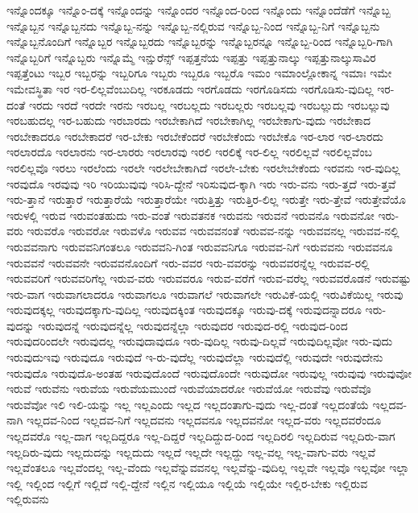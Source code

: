 {ಇನ್ನೊಂದಕ್ಕೂ
ಇನ್ನೊಂ-ದಕ್ಕೆ
ಇನ್ನೊಂದನ್ನು
ಇನ್ನೊಂದರ
ಇನ್ನೊಂದ-ರಿಂದ
ಇನ್ನೊಂದು
ಇನ್ನೊಂದೆಡೆಗೆ
ಇನ್ನೊಬ್ಬ
ಇನ್ನೊಬ್ಬನ
ಇನ್ನೊಬ್ಬನದು
ಇನ್ನೊಬ್ಬ-ನನ್ನು
ಇನ್ನೊಬ್ಬ-ನಲ್ಲಿರುವ
ಇನ್ನೊಬ್ಬ-ನಿಂದ
ಇನ್ನೊಬ್ಬ-ನಿಗೆ
ಇನ್ನೊಬ್ಬನು
ಇನ್ನೊಬ್ಬನೊಂದಿಗೆ
ಇನ್ನೊಬ್ಬರ
ಇನ್ನೊಬ್ಬರದು
ಇನ್ನೊಬ್ಬರನ್ನು
ಇನ್ನೊಬ್ಬರನ್ನೂ
ಇನ್ನೊಬ್ಬ-ರಿಂದ
ಇನ್ನೊಬ್ಬರಿ-ಗಾಗಿ
ಇನ್ನೊಬ್ಬರಿಗೆ
ಇನ್ನೊಬ್ಬರು
ಇನ್ನೊಮ್ಮೆ
ಇನ್ಷುರೆನ್ಸ್
ಇಪ್ಪತ್ತನೆಯ
ಇಪ್ಪತ್ತು
ಇಪ್ಪತ್ತುನಾಲ್ಕು
ಇಪ್ಪತ್ತುನಾಲ್ಕುಸಾವಿರ
ಇಪ್ಪತ್ತೆಂಟು
ಇಬ್ಬರ
ಇಬ್ಬರನ್ನು
ಇಬ್ಬರಿಗೂ
ಇಬ್ಬರು
ಇಬ್ಬರೂ
ಇಬ್ಬರೊ
ಇಮಂ
ಇಮಾಂಲ್ಲೋಕಾನ್ನ
ಇಮಾಃ
ಇಮೇ
ಇಮೇವಸ್ಥಿತಾ
ಇರ
ಇರ-ಲಿಲ್ಲವೆಂಬುದಿಲ್ಲ
ಇರಕೂಡದು
ಇರಗೊಡದು
ಇರಗೊಡಿಸದು
ಇರಗೊಡಿಸು-ವುದಿಲ್ಲ
ಇರ-ದಂತೆ
ಇರದು
ಇರದೆ
ಇರದೇ
ಇರನು
ಇರಬಲ್ಲ
ಇರಬಲ್ಲದು
ಇರಬಲ್ಲರು
ಇರಬಲ್ಲವು
ಇರಬಲ್ಲುದು
ಇರಬಲ್ಲುವು
ಇರಬಹುದಲ್ಲ
ಇರ-ಬಹುದು
ಇರಬಾರದು
ಇರಬೇಕಾಗಿದೆ
ಇರಬೇಕಾಗಿಲ್ಲ
ಇರಬೇಕಾಗು-ವುದು
ಇರಬೇಕಾದ
ಇರಬೇಕಾದರೂ
ಇರಬೇಕಾದರೆ
ಇರ-ಬೇಕು
ಇರಬೇಕೆಂದರೆ
ಇರಬೇಕೆಂದು
ಇರಬೇಕೊ
ಇರ-ಲಾರ
ಇರ-ಲಾರದು
ಇರಲಾರದೊ
ಇರಲಾರನು
ಇರ-ಲಾರರು
ಇರಲಾರವು
ಇರಲಿ
ಇರಲಿಕ್ಕೆ
ಇರ-ಲಿಲ್ಲ
ಇರಲಿಲ್ಲವೆ
ಇರಲಿಲ್ಲವೆಂಬ
ಇರಲಿಲ್ಲವೊ
ಇರಲು
ಇರಲೆಂದು
ಇರಲೇ
ಇರಲೇಬೇಕಾಗಿದೆ
ಇರಲೇ-ಬೇಕು
ಇರಲೇಬೇಕೆಂದು
ಇರವನು
ಇರ-ವುದಿಲ್ಲ
ಇರವುದೊ
ಇರವುವು
ಇರಿ
ಇರಿಯುವುವು
ಇರಿಸಿ-ದ್ದೇನೆ
ಇರಿಸುವುದ-ಕ್ಕಾಗಿ
ಇರು
ಇರು-ವನು
ಇರು-ತ್ತದೆ
ಇರು-ತ್ತವೆ
ಇರು-ತ್ತಾನೆ
ಇರುತ್ತಾರೆ
ಇರುತ್ತಾರೆಯೆ
ಇರುತ್ತಾರೆಯೇ
ಇರುತ್ತಿತ್ತು
ಇರುತ್ತಿರ-ಲಿಲ್ಲ
ಇರುತ್ತೇ
ಇರು-ತ್ತೇವೆ
ಇರುತ್ತೇವೆಯೊ
ಇರುಳಲ್ಲಿ
ಇರುವ
ಇರುವಂತಹುದು
ಇರು-ವಂತೆ
ಇರುವತನಕ
ಇರುವನು
ಇರುವನೆ
ಇರುವನೊ
ಇರುವನೋ
ಇರು-ವರು
ಇರುವರೊ
ಇರುವರೋ
ಇರುವಳೊ
ಇರುವವ
ಇರುವವನಂತೆ
ಇರುವವ-ನನ್ನು
ಇರುವವನಲ್ಲ
ಇರುವವ-ನಲ್ಲಿ
ಇರುವವನಾಗು
ಇರುವವನಿಗಂತಲೂ
ಇರುವವನಿ-ಗಿಂತ
ಇರುವವನಿಗೂ
ಇರುವವ-ನಿಗೆ
ಇರುವವನು
ಇರುವವನೂ
ಇರುವವನೆ
ಇರುವವನೇ
ಇರುವವನೊಂದಿಗೆ
ಇರು-ವವರ
ಇರು-ವವರನ್ನು
ಇರುವವರನ್ನೆಲ್ಲ
ಇರುವವ-ರಲ್ಲಿ
ಇರುವವರಿಗೆ
ಇರುವವರಿಗೆಲ್ಲ
ಇರುವ-ವರು
ಇರುವವರೂ
ಇರುವ-ವರೆಗೆ
ಇರುವ-ವರೆಲ್ಲ
ಇರುವವರೊಡನೆ
ಇರುವಷ್ಟು
ಇರು-ವಾಗ
ಇರುವಾಗಲಾದರೂ
ಇರುವಾಗಲೂ
ಇರುವಾಗಲೆ
ಇರುವಾಗಲೇ
ಇರುವಿಕೆ-ಯಲ್ಲಿ
ಇರುವಿಕೆಯಿಲ್ಲ
ಇರುವು
ಇರುವುದಕ್ಕಲ್ಲ
ಇರುವುದಕ್ಕಾಗು-ವುದಿಲ್ಲ
ಇರುವುದಕ್ಕಿಂತ
ಇರುವುದಕ್ಕೂ
ಇರುವು-ದಕ್ಕೆ
ಇರುವುದನ್ನಾದರೂ
ಇರು-ವುದನ್ನು
ಇರುವುದನ್ನೆ
ಇರುವುದನ್ನೆಲ್ಲ
ಇರುವುದನ್ನೆಲ್ಲಾ
ಇರುವುದರ
ಇರುವುದ-ರಲ್ಲಿ
ಇರುವುದ-ರಿಂದ
ಇರುವುದರಿಂದಲೇ
ಇರುವುದಲ್ಲ
ಇರುವುದಾವುದೂ
ಇರು-ವುದಿಲ್ಲ
ಇರುವು-ದಿಲ್ಲವೆ
ಇರುವುದಿಲ್ಲವೋ
ಇರು-ವುದು
ಇರುವುದುಇವು
ಇರುವುದೂ
ಇರುವುದೆ
ಇ-ರು-ವುದೆಲ್ಲ
ಇರುವುದೆಲ್ಲಾ
ಇರುವುದೆಲ್ಲಿ
ಇರುವುದೇ
ಇರುವುದೇನು
ಇರುವುದೊ
ಇರುವುದೊ-ಅಂತಹ
ಇರುವುದೊಂದೆ
ಇರುವುದೊಂದೇ
ಇರುವುದೋ
ಇರುವುಲ್ಲ
ಇರುವುವು
ಇರುವುವೋ
ಇರುವೆ
ಇರುವೆನು
ಇರುವೆಯ
ಇರುವೆಯಮುಂದೆ
ಇರುವೆಯಾದರೋ
ಇರುವೆಯೋ
ಇರುವೆವು
ಇರುವೆವೊ
ಇರುವೆವೋ
ಇಲಿ
ಇಲಿ-ಯನ್ನು
ಇಲ್ಲ
ಇಲ್ಲಎಂದು
ಇಲ್ಲದ
ಇಲ್ಲದಂತಾಗು-ವುದು
ಇಲ್ಲ-ದಂತೆ
ಇಲ್ಲದಂತೆಯೆ
ಇಲ್ಲದವ-ನಾಗಿ
ಇಲ್ಲದವ-ನಿಂದ
ಇಲ್ಲದವ-ನಿಗೆ
ಇಲ್ಲದವನು
ಇಲ್ಲದವನೂ
ಇಲ್ಲದವನೋ
ಇಲ್ಲದ-ವರು
ಇಲ್ಲದವರೆಂದೂ
ಇಲ್ಲದವರೊ
ಇಲ್ಲ-ದಾಗ
ಇಲ್ಲದಿದ್ದರೂ
ಇಲ್ಲ-ದಿದ್ದರೆ
ಇಲ್ಲದಿದ್ದುದ-ರಿಂದ
ಇಲ್ಲದಿರಲಿ
ಇಲ್ಲದಿರುವ
ಇಲ್ಲದಿರು-ವಾಗ
ಇಲ್ಲದಿರು-ವುದು
ಇಲ್ಲದುದನ್ನು
ಇಲ್ಲದುದು
ಇಲ್ಲದೆ
ಇಲ್ಲದೇ
ಇಲ್ಲದ್ದು
ಇಲ್ಲ-ವಲ್ಲ
ಇಲ್ಲ-ವಾಗು-ವರು
ಇಲ್ಲವೆ
ಇಲ್ಲವೆಂತಲೂ
ಇಲ್ಲವೆಂದಲ್ಲ
ಇಲ್ಲ-ವೆಂದು
ಇಲ್ಲವೆನ್ನುವವನಲ್ಲ
ಇಲ್ಲವೆನ್ನು-ವುದಿಲ್ಲ
ಇಲ್ಲವೇ
ಇಲ್ಲವೊ
ಇಲ್ಲವೋ
ಇಲ್ಲಾ
ಇಲ್ಲಿ
ಇಲ್ಲಿಂದ
ಇಲ್ಲಿಗೆ
ಇಲ್ಲಿದೆ
ಇಲ್ಲಿ-ದ್ದೇನೆ
ಇಲ್ಲಿನ
ಇಲ್ಲಿಯೂ
ಇಲ್ಲಿಯೆ
ಇಲ್ಲಿಯೇ
ಇಲ್ಲಿರ-ಬೇಕು
ಇಲ್ಲಿರುವ
ಇಲ್ಲಿರುವನು
}
